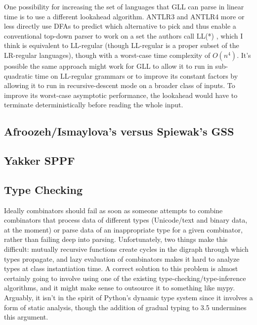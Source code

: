\documentclass[12pt]{article}
\begin{document}
One possibility for increasing the set of languages that GLL can parse
in linear time is to use a different lookahead algorithm.  ANTLR3 and
ANTLR4 more or less directly use DFAs to predict which alternative to
pick and thus enable a conventional top-down parser to work on a set
the authors call LL(*) \parencites{antlr3, antlr4}, which I think is
equivalent to LL-regular (though LL-regular is a proper subset of the
LR-regular languages\parencite{ll-regular}), though with a worst-case
time complexity of $O(n^4)$.  It's possible the same approach might
work for GLL to allow it to run in sub-quadratic time on LL-regular
grammars or to improve its constant factors by allowing it to run in
recursive-descent mode on a broader class of inputs.  To improve its
worst-case asymptotic performance, the lookahead would have to
terminate deterministically before reading the whole input.


\subsection{Afroozeh/Ismaylova's versus Spiewak's GSS}
\label{sec:gss_details}


\subsection{Yakker SPPF}
\label{sec:yakker_sppf}


\subsection{Type Checking}
\label{sec:type_checking}

Ideally combinators should fail as soon as someone attempts to combine
combinators that process data of different types (Unicode/text and
binary data, at the moment) or parse data of an inappropriate type for
a given combinator, rather than failing deep into parsing.
Unfortunately, two things make this difficult: mutually recursive
functions create cycles in the digraph through which types propagate,
and lazy evaluation of combinators makes it hard to analyze types at
class instantiation time.  A correct solution to this problem is
almost certainly going to involve using one of the existing
type-checking/type-inference algorithms, and it might make sense to
outsource it to something like mypy.  Arguably, it isn't in the spirit
of Python's dynamic type system since it involves a form of static
analysis, though the addition of gradual typing to 3.5 undermines this
argument.
\end{document}
